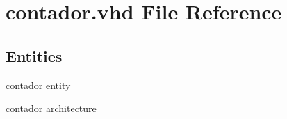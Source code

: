 \hypertarget{contador_8vhd}{}\section{contador.\+vhd File Reference}
\label{contador_8vhd}
\subsection*{Entities}
\begin{DoxyCompactItemize}
\item 
\hyperlink{classcontador}{contador} entity
\item 
\hyperlink{classcontador_1_1contador}{contador} architecture
\end{DoxyCompactItemize}

